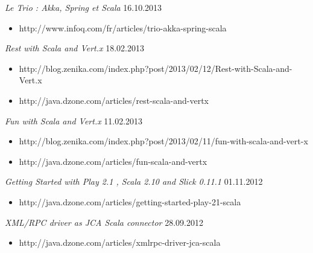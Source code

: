 \documentclass{res}
\begin{document}
\begin{resume}
{\sl Le Trio : Akka, Spring et Scala}  \hfill    16.10.2013	\\
\vspace{-5mm}  \begin{itemize}
 \item[]  \scriptsize http://www.infoq.com/fr/articles/trio-akka-spring-scala
\end{itemize}
\vspace{-2mm}

{\sl Rest with Scala and Vert.x}  \hfill    18.02.2013	\\
\vspace{-5mm}  \begin{itemize}
\item[]  \scriptsize http://blog.zenika.com/index.php?post/2013/02/12/Rest-with-Scala-and-Vert.x
\vspace{-2mm}
\item[]  \scriptsize http://java.dzone.com/articles/rest-scala-and-vertx
\end{itemize}
\vspace{-2mm}

{\sl Fun with Scala and Vert.x}  \hfill    11.02.2013	\\
\vspace{-5mm}  \begin{itemize}
\item[]  \scriptsize http://blog.zenika.com/index.php?post/2013/02/11/fun-with-scala-and-vert-x
\vspace{-2mm}
\item[]  \scriptsize http://java.dzone.com/articles/fun-scala-and-vertx
\end{itemize}
\vspace{-2mm}

{\sl Getting Started with Play 2.1 , Scala 2.10 and Slick 0.11.1}  \hfill    01.11.2012	\\
\vspace{-5mm}  \begin{itemize}
\item[]  \scriptsize http://java.dzone.com/articles/getting-started-play-21-scala
\end{itemize}
\vspace{-2mm}

{\sl XML/RPC driver as JCA Scala connector}  \hfill    28.09.2012	\\
\vspace{-5mm}  \begin{itemize}
\item[]  \scriptsize http://java.dzone.com/articles/xmlrpc-driver-jca-scala
\end{itemize}
\vspace{-2mm}


\end{resume}
\end{document}
